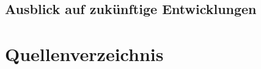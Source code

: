 \documentclass[12pt,bibtotoc]{article}
\newcounter{romanBeginningEnd} %
\begin{document}
		\subsection{Ausblick auf zukünftige Entwicklungen}




	
	
	\newpage
	\setcounter{page}{\theromanBeginningEnd} %
	\setcounter{secnumdepth}{0} %
	\section{Quellenverzeichnis}
	\setcounter{secnumdepth}{3} %
	\printbibliography[heading=none]
	\newpage
	\appendix
	\clearpage
	
\end{document}
